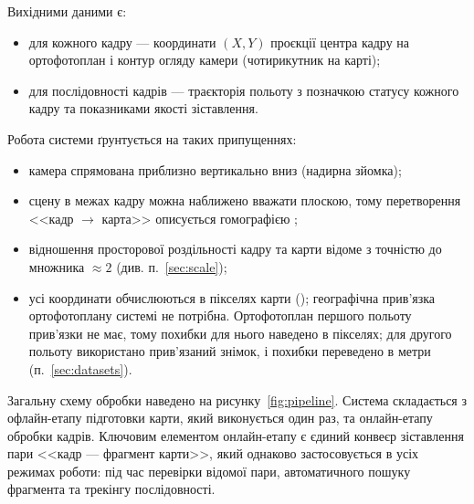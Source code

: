 \documentclass[a4paper, 12pt, titlepage]{article}
\begin{document}
Вихідними даними є:
\begin{itemize}
    \item для кожного кадру --- координати $(X, Y)$ проєкції центра кадру на ортофотоплан і контур огляду камери (чотирикутник на карті);
    \item для послідовності кадрів --- траєкторія польоту з позначкою статусу кожного кадру та показниками якості зіставлення.
\end{itemize}

Робота системи ґрунтується на таких припущеннях:
\begin{itemize}
    \item камера спрямована приблизно вертикально вниз (надирна зйомка);
    \item сцену в межах кадру можна наближено вважати плоскою, тому перетворення <<кадр $\to$ карта>> описується гомографією \cite{hartley};
    \item відношення просторової роздільності кадру та карти відоме з точністю до множника $\approx 2$ (див. п.~\ref{sec:scale});
    \item усі координати обчислюються в пікселях карти (\px{}); географічна прив'язка ортофотоплану системі не потрібна. Ортофотоплан першого польоту прив'язки не має, тому похибки для нього наведено в пікселях; для другого польоту використано прив'язаний знімок, і похибки переведено в метри (п.~\ref{sec:datasets}).
\end{itemize}

Загальну схему обробки наведено на рисунку~\ref{fig:pipeline}. Система складається з офлайн-етапу підготовки карти, який виконується один раз, та онлайн-етапу обробки кадрів. Ключовим елементом онлайн-етапу є єдиний конвеєр зіставлення пари <<кадр --- фрагмент карти>>, який однаково застосовується в усіх режимах роботи: під час перевірки відомої пари, автоматичного пошуку фрагмента та трекінгу послідовності.
\end{document}
